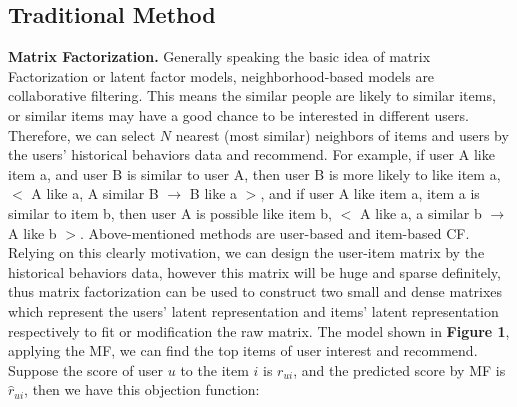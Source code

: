 \documentclass[10pt,twocolumn,letterpaper]{article}
\begin{document}
\subsection{Traditional Method}
{\bf Matrix Factorization.} Generally speaking the basic idea of matrix Factorization or latent factor models, neighborhood-based models are collaborative filtering. This means the similar people are likely to similar items, or similar items may have a good chance to be interested in different users. Therefore, we can select $N$ nearest (most similar) neighbors of items and users by the users' historical behaviors data and recommend. For example, if user A like item a, and user B is similar to user A, then user B is more likely to like item a, $<$ A like a, A similar B $\to$ B like a $>$, and if user A like item a, item a is similar to item b, then user A is possible like item b, $<$ A like a, a similar b $\to$ A like b $>$. Above-mentioned methods are user-based and item-based CF. Relying on this clearly motivation, we can design the user-item matrix by the historical behaviors data, however this matrix will be huge and sparse definitely, thus matrix factorization can be used to construct two small and dense matrixes which represent the users' latent representation and items' latent representation respectively to fit or modification the raw matrix. The model shown in {\bf Figure 1}, applying the MF, we can find the top items of user interest and recommend. Suppose the score of user $u$ to the item $i$ is $r_{ui}$, and the predicted score by MF is $\hat{r}_{ui}$, then we have this objection function:
\end{document}
